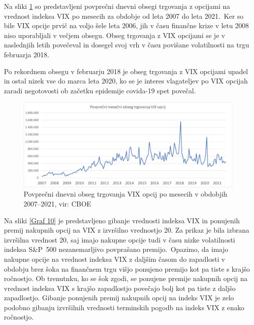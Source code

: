 \documentclass[12pt,a4paper, reqno]{amsart}
\theoremstyle{definition} %
\theoremstyle{plain} %
\begin{document}
Na sliki \ref{Graf 8} so predstavljeni povprečni dnevni obsegi trgovanja z opcijami na vrednost indeksa VIX po mesecih za obdobje od leta 2007 do leta 2021.\
Ker so bile VIX opcije prvič na voljo šele leta 2006, jih v času finančne krize v letu 2008 niso uporabljali v večjem obsegu. Obseg trgovanja z VIX opcijami se je v naslednjih letih povečeval in dosegel svoj vrh v času povišane volatilnosti na trgu februarja 2018.

Po rekordnem obsegu v februarju 2018 je obseg trgovanja z VIX opcijami upadel in ostal nizek vse do marca leta 2020, ko se je interes vlagateljev po VIX opcijah zaradi negotovosti ob začetku epidemije covida-19 spet povečal.

\begin{figure}[!h]
\centering
\includegraphics[width = 15 cm]{Grafi/VIX_options_volume.png}
\caption{Povprečni dnevni obseg trgovanja VIX opcij po mesecih v obdobjih 2007--2021, vir: CBOE}
\label{Graf 8}
\end{figure}


Na sliki \ref{Graf 10} je predstavljeno gibanje vrednosti indeksa VIX in ponujenih premij nakupnih opcij na VIX z izvršilno vrednostjo 20. Za prikaz je bila izbrana izvršilna vrednost 20, saj imajo nakupne opcije tudi v času nizke volatilnosti indeksa S\&P~500 nezanemarljivo povprašano premijo.\
Opazimo, da imajo nakupne opcije na vrednost indeksa VIX z daljšim časom do zapadlosti v obdobju brez šoka na finančnem trgu višjo ponujeno premijo kot pa tiste s krajšo ročnostjo. Ob trenutnku, ko se šok zgodi, se ponujene premije nakupnih opcij na vrednost indeksa VIX s krajšo zapadlostjo povečajo bolj kot pa tiste z daljšo zapadlostjo. Gibanje ponujenih premij nakupnih opcij na indeks VIX je zelo podobno gibanju izvršilnih vrednosti terminskih pogodb na indeks VIX z enako ročnostjo. \newline
\end{document}
